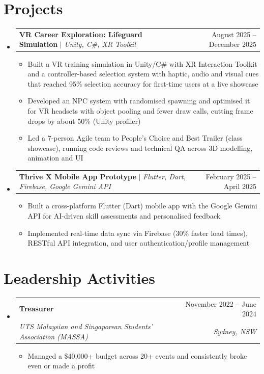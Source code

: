 \documentclass[letterpaper,11pt]{article}
\makeatletter
\newcommand{\resumeItem}[1]{
  \item\small{
    {#1 \vspace{-2pt}}
  }
}
\newcommand{\resumeSubheading}[4]{
  \vspace{-2pt}\item
    \begin{tabular*}{0.97\textwidth}[t]{l@{\extracolsep{\fill}}r}
      \textbf{#1} & #2 \\
      \textit{\small#3} & \textit{\small #4} \\
    \end{tabular*}\vspace{-7pt}
}
\newcommand{\resumeProjectHeading}[2]{
    \item
    \begin{tabular*}{0.97\textwidth}{l@{\extracolsep{\fill}}r}
      \small#1 & #2 \\
    \end{tabular*}\vspace{-7pt}
}
\newcommand{\resumeSubHeadingListStart}{\begin{itemize}[leftmargin=0.15in, label={}]}
\newcommand{\resumeSubHeadingListEnd}{\end{itemize}}
\newcommand{\resumeItemListStart}{\begin{itemize}}
\newcommand{\resumeItemListEnd}{\end{itemize}\vspace{-5pt}}
\makeatother
\begin{document}
\section{Projects}
  \resumeSubHeadingListStart
    \resumeProjectHeading
      {\textbf{VR Career Exploration: Lifeguard Simulation} $|$ \emph{Unity, C\#, XR Toolkit}}{August 2025 -- December 2025}
      \resumeItemListStart
        \resumeItem{Built a VR training simulation in Unity/C\# with XR Interaction Toolkit and a controller-based selection system with haptic, audio and visual cues that reached 95\% selection accuracy for first-time users at a live showcase}
        \resumeItem{Developed an NPC system with randomised spawning and optimised it for VR headsets with object pooling and fewer draw calls, cutting frame drops by about 50\% (Unity profiler)}
        \resumeItem{Led a 7-person Agile team to People's Choice and Best Trailer (class showcase), running code reviews and technical QA across 3D modelling, animation and UI}
      \resumeItemListEnd

    \resumeProjectHeading
      {\textbf{Thrive X Mobile App Prototype} $|$ \emph{Flutter, Dart, Firebase, Google Gemini API}}{February 2025 -- April 2025}
      \resumeItemListStart
        \resumeItem{Built a cross-platform Flutter (Dart) mobile app with the Google Gemini API for AI-driven skill assessments and personalised feedback}
        \resumeItem{Implemented real-time data sync via Firebase (30\% faster load times), RESTful API integration, and user authentication/profile management}
      \resumeItemListEnd
  \resumeSubHeadingListEnd


\section{Leadership Activities}
  \resumeSubHeadingListStart
    \resumeSubheading
      {Treasurer}{November 2022 -- June 2024}
      {UTS Malaysian and Singaporean Students' Association (MASSA)}{Sydney, NSW}
      \resumeItemListStart
        \resumeItem{Managed a \$40,000+ budget across 20+ events and consistently broke even or made a profit}
      \resumeItemListEnd
  \resumeSubHeadingListEnd


\end{document}
